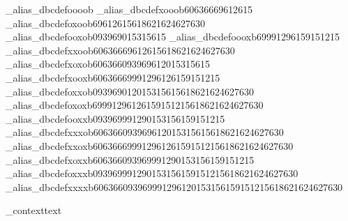 \brl@char_alias_dbcdef{oooob}{}
\brl@char_alias_dbcdef{xooob}{{6}{0}{6}{3}{6}{6}{6}{9}{6}{12}{6}{15}}%
\brl@char_alias_dbcdef{oxoob}{{6}{9}{6}{12}{6}{15}{6}{18}{6}{21}{6}{24}{6}{27}{6}{30}}
\brl@char_alias_dbcdef{ooxob}{{0}{9}{3}{9}{6}{9}{0}{15}{3}{15}{6}{15}}
\brl@char_alias_dbcdef{oooxb}{{6}{9}{9}{9}{12}{9}{6}{15}{9}{15}{12}{15}}
\brl@char_alias_dbcdef{xxoob}{{6}{0}{6}{3}{6}{6}{6}{9}{6}{12}{6}{15}{6}{18}{6}{21}{6}{24}{6}{27}{6}{30}}
\brl@char_alias_dbcdef{xoxob}{{6}{0}{6}{3}{6}{6}{0}{9}{3}{9}{6}{9}{6}{12}{0}{15}{3}{15}{6}{15}}
\brl@char_alias_dbcdef{xooxb}{{6}{0}{6}{3}{6}{6}{6}{9}{9}{9}{12}{9}{6}{12}{6}{15}{9}{15}{12}{15}}
\brl@char_alias_dbcdef{oxxob}{{0}{9}{3}{9}{6}{9}{0}{12}{0}{15}{3}{15}{6}{15}{6}{18}{6}{21}{6}{24}{6}{27}{6}{30}}
\brl@char_alias_dbcdef{oxoxb}{{6}{9}{9}{9}{12}{9}{6}{12}{6}{15}{9}{15}{12}{15}{6}{18}{6}{21}{6}{24}{6}{27}{6}{30}}
\brl@char_alias_dbcdef{ooxxb}{{0}{9}{3}{9}{6}{9}{9}{9}{12}{9}{0}{15}{3}{15}{6}{15}{9}{15}{12}{15}}
\brl@char_alias_dbcdef{xxxob}{{6}{0}{6}{3}{6}{6}{0}{9}{3}{9}{6}{9}{6}{12}{0}{15}{3}{15}{6}{15}{6}{18}{6}{21}{6}{24}{6}{27}{6}{30}}
\brl@char_alias_dbcdef{xxoxb}{{6}{0}{6}{3}{6}{6}{6}{9}{9}{9}{12}{9}{6}{12}{6}{15}{9}{15}{12}{15}{6}{18}{6}{21}{6}{24}{6}{27}{6}{30}}
\brl@char_alias_dbcdef{xoxxb}{{6}{0}{6}{3}{6}{6}{0}{9}{3}{9}{6}{9}{9}{9}{12}{9}{0}{15}{3}{15}{6}{15}{9}{15}{12}{15}}
\brl@char_alias_dbcdef{oxxxb}{{0}{9}{3}{9}{6}{9}{9}{9}{12}{9}{0}{15}{3}{15}{6}{15}{9}{15}{12}{15}{6}{18}{6}{21}{6}{24}{6}{27}{6}{30}}
\brl@char_alias_dbcdef{xxxxb}{{6}{0}{6}{3}{6}{6}{0}{9}{3}{9}{6}{9}{9}{9}{12}{9}{6}{12}{0}{15}{3}{15}{6}{15}{9}{15}{12}{15}{6}{18}{6}{21}{6}{24}{6}{27}{6}{30}}





\brl@char_context{text}




